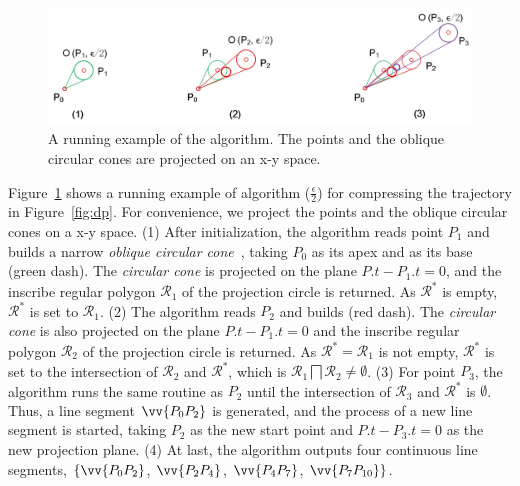 \begin{figure}[tb!]
	\centering
	\includegraphics[scale=0.66]{Figures/Fig-Conest.jpg}
	\vspace{-1ex}
	\caption{\small A running example of the \cised algorithm. The points and the oblique circular cones are projected on an x-y space. }%
	\vspace{-2ex}
	\label{fig:exm-conest}
\end{figure}

\begin{example}
	\label{exm-alg-conest}
	Figure~\ref{fig:exm-conest} shows a running example of algorithm \cised($\frac{\epsilon}{2}$) for compressing the trajectory  in Figure~\ref{fig:dp}.
	For convenience, we project the points and the oblique circular cones on a x-y space.
	(1) After initialization, the \cised algorithm reads point $P_1$ and builds a narrow \emph{oblique circular cone}~, taking $P_0$ as its apex and  as its base (green dash). The \emph{circular cone} is projected on the plane $P.t-P_1.t=0$, and the inscribe regular polygon $\mathcal{R}_1$ of the projection circle is returned. As $\mathcal{R}^*$ is empty, $\mathcal{R}^*$ is set to $\mathcal{R}_1$.
	(2) The algorithm reads $P_2$ and builds  (red dash). The \emph{circular cone} is also projected on the plane $P.t-P_1.t=0$ and the inscribe regular polygon $\mathcal{R}_2$ of the projection circle is returned. As $\mathcal{R}^*=\mathcal{R}_1$ is not empty, $\mathcal{R}^*$ is set to the intersection of $\mathcal{R}_2$ and $\mathcal{R}^*$, which is $\mathcal{R}_1 \bigsqcap \mathcal{R}_2 \ne \emptyset$.
	(3) For point $P_3$, the algorithm runs the same routine as $P_2$ until the intersection of $\mathcal{R}_3$ and $\mathcal{R}^*$ is $\emptyset$. Thus, a line segment $\vv{P_0P_2}$ is generated, and the process of a new line segment is started, taking $P_2$ as the new start point and $P.t-P_3.t=0$ as the new projection plane.
	(4) At last, the algorithm outputs four continuous line segments, \ie $\{\vv{P_0P_2}$, $\vv{P_2P_4}$, $\vv{P_4P_{7}}$, $\vv{P_7P_{10}}\}$. %
\end{example} 	


